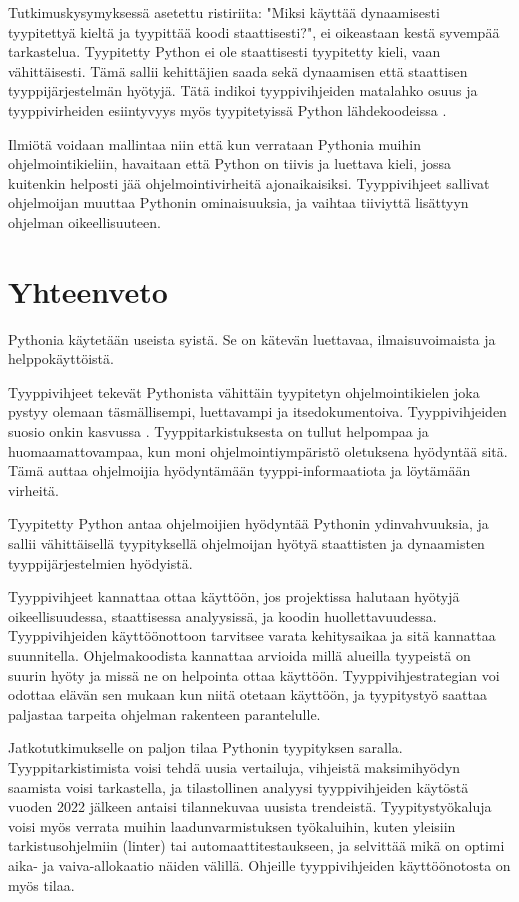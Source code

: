 \begin{otherlanguage}{finnish}
Tutkimuskysymyksessä asetettu ristiriita: "Miksi käyttää dynaamisesti tyypitettyä kieltä ja tyypittää koodi staattisesti?", ei oikeastaan kestä syvempää tarkastelua. Tyypitetty Python ei ole staattisesti tyypitetty kieli, vaan vähittäisesti. Tämä sallii kehittäjien saada sekä dynaamisen että staattisen tyyppijärjestelmän hyötyjä. Tätä indikoi tyyppivihjeiden matalahko osuus ja tyyppivirheiden esiintyvyys myös tyypitetyissä Python lähdekoodeissa \cite{di_grazia_evolution_2022, rak-amnouykit_taleoftwo_2020}.

Ilmiötä voidaan mallintaa niin että kun verrataan Pythonia muihin ohjelmointikieliin, havaitaan että Python on tiivis ja luettava kieli, jossa kuitenkin helposti jää ohjelmointivirheitä ajonaikaisiksi. Tyyppivihjeet sallivat ohjelmoijan muuttaa Pythonin ominaisuuksia, ja vaihtaa tiiviyttä lisättyyn ohjelman oikeellisuuteen.

\section*{Yhteenveto}

Pythonia käytetään useista syistä. Se on kätevän luettavaa, ilmaisuvoimaista ja helppokäyttöistä.

Tyyppivihjeet tekevät Pythonista vähittäin tyypitetyn ohjelmointikielen joka pystyy olemaan täsmällisempi, luettavampi ja itsedokumentoiva. Tyyppivihjeiden suosio onkin kasvussa \cite{jin_where_to_start_2021, khan_empirical_2022}. Tyyppitarkistuksesta on tullut helpompaa ja huomaamattovampaa, kun moni ohjelmointiympäristö oletuksena hyödyntää sitä. Tämä auttaa ohjelmoijia hyödyntämään tyyppi-informaatiota ja löytämään virheitä.

Tyypitetty Python antaa ohjelmoijien hyödyntää Pythonin ydinvahvuuksia, ja sallii vähittäisellä tyypityksellä ohjelmoijan hyötyä staattisten ja dynaamisten tyyppijärjestelmien hyödyistä.

Tyyppivihjeet kannattaa ottaa käyttöön, jos projektissa halutaan hyötyjä oikeellisuudessa, staattisessa analyysissä, ja koodin huollettavuudessa. Tyyppivihjeiden käyttöönottoon tarvitsee varata kehitysaikaa ja sitä kannattaa suunnitella. Ohjelmakoodista kannattaa arvioida millä alueilla tyypeistä on suurin hyöty ja missä ne on helpointa ottaa käyttöön. Tyyppivihjestrategian voi odottaa elävän sen mukaan kun niitä otetaan käyttöön, ja tyypitystyö saattaa paljastaa tarpeita ohjelman rakenteen parantelulle.

Jatkotutkimukselle on paljon tilaa Pythonin tyypityksen saralla. Tyyppitarkistimista voisi tehdä uusia vertailuja, vihjeistä maksimihyödyn saamista voisi tarkastella, ja tilastollinen analyysi tyyppivihjeiden käytöstä vuoden 2022 jälkeen antaisi tilannekuvaa uusista trendeistä. Tyypitystyökaluja voisi myös verrata muihin laadunvarmistuksen työkaluihin, kuten yleisiin tarkistusohjelmiin (linter) tai automaattitestaukseen, ja selvittää mikä on optimi aika- ja vaiva-allokaatio näiden välillä. Ohjeille tyyppivihjeiden käyttöönotosta on myös tilaa.
\end{otherlanguage}
